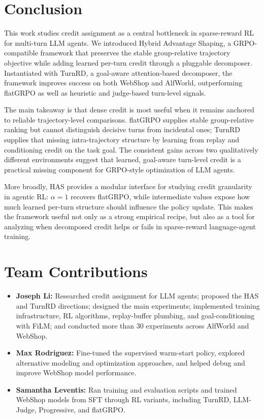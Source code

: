 \documentclass{article}
\begin{document}
\section{Conclusion}
\label{sec:conclusion}
This work studies credit assignment as a central bottleneck in sparse-reward RL for multi-turn
LLM agents. We introduced Hybrid Advantage Shaping, a GRPO-compatible framework that preserves
the stable group-relative trajectory objective while adding learned per-turn credit through a
pluggable decomposer. Instantiated with TurnRD, a goal-aware attention-based decomposer, the
framework improves success on both WebShop and AlfWorld, outperforming flatGRPO as well as
heuristic and judge-based turn-level signals.

The main takeaway is that dense credit is most useful when it remains anchored to reliable
trajectory-level comparisons. flatGRPO supplies stable group-relative ranking but cannot
distinguish decisive turns from incidental ones; TurnRD supplies that missing intra-trajectory
structure by learning from replay and conditioning credit on the task goal. The consistent gains
across two qualitatively different environments suggest that learned, goal-aware turn-level
credit is a practical missing component for GRPO-style optimization of LLM agents.

More broadly, HAS provides a modular interface for studying credit granularity in agentic RL:
$\alpha{=}1$ recovers flatGRPO, while intermediate values expose how much learned per-turn
structure should influence the policy update. This makes the framework useful not only as a
strong empirical recipe, but also as a tool for analyzing when decomposed credit helps or fails
in sparse-reward language-agent training.

\section{Team Contributions}
\begin{itemize}
  \item \textbf{Joseph Li:} Researched credit assignment for LLM agents; proposed the HAS and
  TurnRD directions; designed the main experiments; implemented training infrastructure,
  RL algorithms, replay-buffer plumbing, and goal-conditioning with FiLM; and conducted more
  than 30 experiments across AlfWorld and WebShop.
  \item \textbf{Max Rodriguez:} Fine-tuned the supervised warm-start policy, explored
  alternative modeling and optimization approaches, and helped debug and improve WebShop model
  performance.
  \item \textbf{Samantha Leventis:} Ran training and evaluation scripts and trained WebShop
  models from SFT through RL variants, including TurnRD, LLM-Judge, Progressive, and flatGRPO.
\end{itemize}
\end{document}
